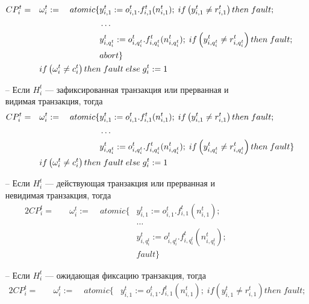 \begin{myproof}
\begin{figure}
\begin{itemize}
\begin{alignat}{2}
     CP^t_i =&\quad \omega^t_{i} := &\; atomic\{&y^t_{i,1} := o^t_{i,1}.f^t_{i,1}(n^t_{i,1}); \; if \left (y^t_{i,1} \neq r^t_{i,1}\right) then \; fault; \nonumber \\
         &           &&\ldots \nonumber \\
         &           &&y^t_{i,q^t_i} := o^t_{i,q^t_i}.f^t_{i,q^t_i}(n^t_{i,q^t_i}); \; if \left (y^t_{i,q^t_i} \neq r^t_{i,q^t_i}\right) then \; fault; \nonumber \\
         &           &&abort \} \nonumber \\
         &\quad \mathrlap{if \left(\omega^t_{i} \neq c^t_{i} \right) then \; fault \; else \; g^t_{i} := 1} \nonumber
\end{alignat}
\item[--] Если $H^t_{i}$ --- зафиксированная транзакция или прерванная и видимая транзакция, тогда
\begin{alignat}{2}
     CP^t_i =&\quad \omega^t_{i} := &\; atomic\{&y^t_{i,1} := o^t_{i,1}.f^t_{i,1}(n^t_{i,1}); \; if \left (y^t_{i,1} \neq r^t_{i,1}\right) then \; fault; \nonumber \\
         &           &&\ldots \nonumber \\
         &           &&y^t_{i,q^t_i} := o^t_{i,q^t_i}.f^t_{i,q^t_i}(n^t_{i,q^t_i}); \; if \left (y^t_{i,q^t_i} \neq r^t_{i,q^t_i}\right) then \; fault\} \nonumber \\
         &\quad \mathrlap{if \left(\omega^t_{i} \neq c^t_{i} \right) then \; fault \; else \; g^t_{i} := 1} \nonumber
\end{alignat}
\item[--] Если $H^t_{i}$ --- действующая транзакция или прерванная и невидимая транзакция, тогда
\begin{alignat}{2}
     CP^t_i =&\quad \omega^t_{i} := &\; atomic\{&y^t_{i,1} := o^t_{i,1}.f^t_{i,1}(n^t_{i,1}); \nonumber \\
         &           &&\ldots \nonumber \\
         &           &&y^t_{i,q^t_i} := o^t_{i,q^t_i}.f^t_{i,q^t_i}(n^t_{i,q^t_i}); \nonumber \\
         &           &&fault \} \nonumber
\end{alignat}
\item[--] Если $H^t_{i}$ --- ожидающая фиксацию транзакция, тогда 
\begin{alignat}{2}
     CP^t_i =&\quad \omega^t_{i} := &\; atomic\{&y^t_{i,1} := o^t_{i,1}.f^t_{i,1}(n^t_{i,1}); \; if \left (y^t_{i,1} \neq r^t_{i,1}\right) then \; fault; \nonumber \\

\end{alignat}
\end{itemize}
\end{figure}
\end{myproof}
